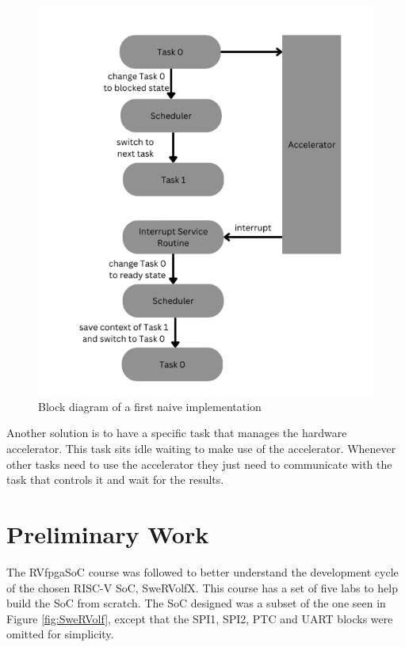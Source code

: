 \begin{figure}[H]
    \centering
    \includegraphics[scale=0.4]{Figures/simpleImpl.png}
    \caption{Block diagram of a first naive implementation}
    \label{fig:simpleImpl}
\end{figure}

Another solution is to have a specific task that manages the hardware accelerator. This task sits idle waiting to make use of the accelerator. Whenever other tasks need to use the accelerator they just need to communicate with the task that controls it and wait for the results.


\section{Preliminary Work}
The RVfpgaSoC \cite{RVfpgaSoC} course was followed to better understand the development cycle of the chosen RISC-V SoC, SweRVolfX. This course has a set of five labs to help build the SoC from scratch. The SoC designed was a subset of the one seen in Figure \ref{fig:SweRVolf}, except that the SPI1, SPI2, PTC and UART blocks were omitted for simplicity.

